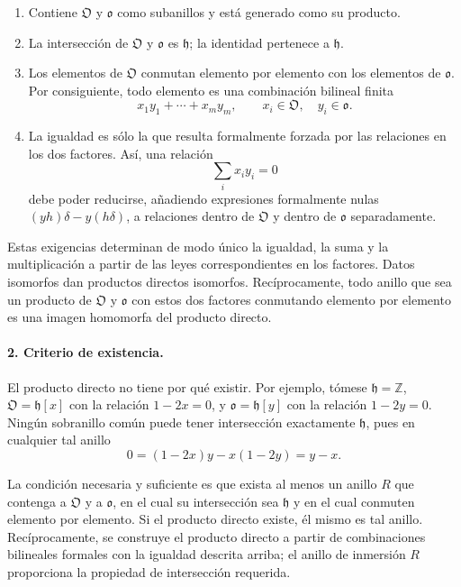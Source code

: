 \documentclass[11pt]{article}
\begin{document}
\begin{enumerate}
\item Contiene $\mathfrak O$ y $\mathfrak o$ como subanillos y está generado como su producto.
\item La intersección de $\mathfrak O$ y $\mathfrak o$ es $\mathfrak h$; la identidad pertenece a $\mathfrak h$.
\item Los elementos de $\mathfrak O$ conmutan elemento por elemento con los elementos de $\mathfrak o$. Por consiguiente, todo elemento es una combinación bilineal finita
\[
        x_1y_1+\cdots+x_my_m,
        \qquad x_i\in\mathfrak O,
        \quad y_i\in\mathfrak o.
\]
\item La igualdad es sólo la que resulta formalmente forzada por las relaciones en los dos factores. Así, una relación
\[
        \sum_i x_i y_i=0
\]
debe poder reducirse, añadiendo expresiones formalmente nulas $(yh)\delta-y(h\delta)$, a relaciones dentro de $\mathfrak O$ y dentro de $\mathfrak o$ separadamente.
\end{enumerate}

Estas exigencias determinan de modo único la igualdad, la suma y la multiplicación a partir de las leyes correspondientes en los factores. Datos isomorfos dan productos directos isomorfos. Recíprocamente, todo anillo que sea un producto de $\mathfrak O$ y $\mathfrak o$ con estos dos factores conmutando elemento por elemento es una imagen homomorfa del producto directo.

\paragraph{2. Criterio de existencia.}
El producto directo no tiene por qué existir. Por ejemplo, tómese $\mathfrak h=\mathbb Z$, $\mathfrak O=\mathfrak h[x]$ con la relación $1-2x=0$, y $\mathfrak o=\mathfrak h[y]$ con la relación $1-2y=0$. Ningún sobranillo común puede tener intersección exactamente $\mathfrak h$, pues en cualquier tal anillo
\[
        0=(1-2x)y-x(1-2y)=y-x.
\]

La condición necesaria y suficiente es que exista al menos un anillo $R$ que contenga a $\mathfrak O$ y a $\mathfrak o$, en el cual su intersección sea $\mathfrak h$ y en el cual conmuten elemento por elemento. Si el producto directo existe, él mismo es tal anillo. Recíprocamente, se construye el producto directo a partir de combinaciones bilineales formales con la igualdad descrita arriba; el anillo de inmersión $R$ proporciona la propiedad de intersección requerida.
\end{document}

